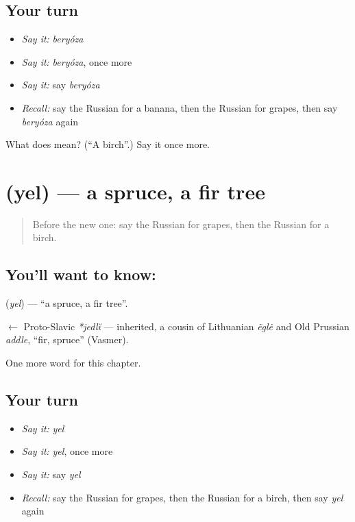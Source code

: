 \subsection*{Your turn}
\begin{itemize}
\raggedright
  \item \emph{Say it:} \emph{beryóza}
  \item \emph{Say it:} \emph{beryóza}, once more
  \item \emph{Say it:} say \emph{beryóza}
  \item \emph{Recall:} say the Russian for a banana, then the Russian for grapes, then say \emph{beryóza} again
\end{itemize}

\begin{tcolorbox}[breakable,colback=teal!4,colframe=teal!35!black,title={Before you move on}]
What does  mean? (\textquotedblleft{}A birch\textquotedblright{}.) Say it once more.
\end{tcolorbox}
\section[\texorpdfstring{\ru{ель} (yel)}{ель (yel)}]{ (yel) — a spruce, a fir tree}

\label{lesson:RU-C224-yel}



\begin{quote}
Before the new one: say the Russian for grapes, then the Russian for a birch.
\end{quote}

\subsection*{You'll want to know: }
\textbf{} (\emph{yel}) — \textquotedblleft{}a spruce, a fir tree\textquotedblright{}.

\begin{cousinweb}
\textbf{} $\leftarrow$ Proto-Slavic \emph{*jedlĭ} — inherited, a cousin of Lithuanian \emph{ẽglė} and Old Prussian \emph{addle}, \textquotedblleft{}fir, spruce\textquotedblright{} (Vasmer).
\end{cousinweb}

\begin{grammarlens}[title={What you've built}]
One more word for this chapter.
\end{grammarlens}

\subsection*{Your turn}
\begin{itemize}
\raggedright
  \item \emph{Say it:} \emph{yel}
  \item \emph{Say it:} \emph{yel}, once more
  \item \emph{Say it:} say \emph{yel}
  \item \emph{Recall:} say the Russian for grapes, then the Russian for a birch, then say \emph{yel} again
\end{itemize}

